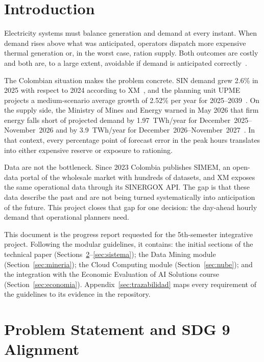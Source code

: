 \documentclass[conference,10pt]{IEEEtran}
\begin{document}
\section{Introduction}
Electricity systems must balance generation and demand at every instant. When demand rises above what was anticipated, operators dispatch more expensive thermal generation or, in the worst case, ration supply. Both outcomes are costly and both are, to a large extent, avoidable if demand is anticipated correctly~\cite{hong2016}.

The Colombian situation makes the problem concrete. SIN demand grew 2.6\% in 2025 with respect to 2024 according to XM~\cite{lr2025}, and the planning unit UPME projects a medium-scenario average growth of 2.52\% per year for 2025--2039~\cite{upme2026}. On the supply side, the Ministry of Mines and Energy warned in May 2026 that firm energy falls short of projected demand by 1.97~TWh/year for December~2025--November~2026 and by 3.9~TWh/year for December~2026--November~2027~\cite{minminas2026}. In that context, every percentage point of forecast error in the peak hours translates into either expensive reserve or exposure to rationing.

Data are not the bottleneck. Since 2023 Colombia publishes SIMEM, an open-data portal of the wholesale market with hundreds of datasets, and XM exposes the same operational data through its SINERGOX API. The gap is that these data describe the past and are not being turned systematically into anticipation of the future. This project closes that gap for one decision: the day-ahead hourly demand that operational planners need.

This document is the progress report requested for the 5th-semester integrative project. Following the modular guidelines, it contains: the initial sections of the technical paper (Sections~\ref{sec:problema}--\ref{sec:sistema}); the Data Mining module (Section~\ref{sec:mineria}); the Cloud Computing module (Section~\ref{sec:nube}); and the integration with the Economic Evaluation of AI Solutions course (Section~\ref{sec:economia}). Appendix~\ref{sec:trazabilidad} maps every requirement of the guidelines to its evidence in the repository.

\section{Problem Statement and SDG 9 Alignment}\label{sec:problema}
\end{document}
